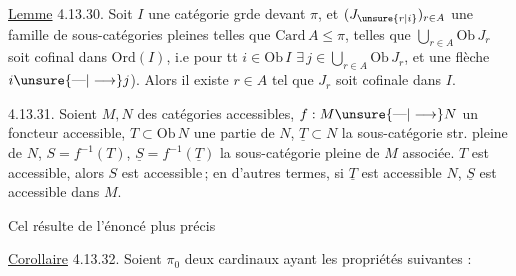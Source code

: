 \uline{Lemme} 4.13.30. Soit $I$ une catégorie grde devant $\pi$, et $(J_{\unsure{r|i}})_{r\in A}$ une famille de sous-catégories pleines telles que $\mathrm{Card}\,A\leq\pi$,  telles que $\bigcup_{r\in A}\mathrm{Ob}\,J_r$ soit cofinal dans $\mathrm{Ord}(I)$, i.e pour tt $i\in\mathrm{Ob}\,I$  $\exists\,j\in\bigcup_{r\in A}\mathrm{Ob}\,J_r$, et une flèche $i\unsure{\text{---}|\longrightarrow}j$). Alors il existe  $r\in A$ tel que $J_r$ soit cofinale dans $I$.

  4.13.31. Soient $M,N$ des catégories accessibles, $f:M\unsure{\text{---}|\longrightarrow}N$ un foncteur accessible,  $T\subset\mathrm{Ob}\,N$ une partie  de $N$, $\underline T\subset N$ la sous-catégorie str. pleine  de $N$,  $S=f^{-1}(T)$, $\underline S=f^{-1}(\underline T)$ la sous-catégorie pleine de $M$ associée.  $T$ est accessible, alors $S$ est accessible\,; en d'autres termes, si $\underline T$ est accessible  $N$, $\underline S$ est accessible dans $M$.

Cel résulte de l'énoncé plus précis\unsure{:}

\uline{Corollaire} 4.13.32. Soient $\pi_0$  deux cardinaux ayant les propriétés suivantes :

